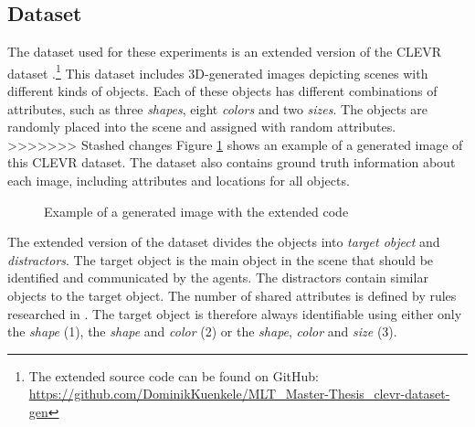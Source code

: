 \documentclass[11pt]{article}
\begin{document}
\subsection{Dataset}
The dataset used for these experiments is an extended version of the CLEVR dataset \citep{Johnson2016}.\footnote{The extended source code can be found on GitHub: \href{https://github.com/DominikKuenkele/MLT\_Master-Thesis\_clevr-dataset-gen}{https://github.com/DominikKuenkele/MLT\_Master-Thesis\_clevr-dataset-gen}} This dataset includes 3D-generated images depicting scenes with different kinds of objects. Each of these objects has different combinations of attributes, such as three \emph{shapes}, eight \emph{colors} and two \emph{sizes}. The objects are randomly placed into the scene and assigned with random attributes.
>>>>>>> Stashed changes
Figure \ref{fig:clevr-extended_example} shows an example of a generated image of this CLEVR dataset. The dataset also contains ground truth information about each image, including attributes and locations for all objects.

\begin{figure}[h]
  \centering
  \caption{Example of a generated image with the extended code} %
  \label{fig:clevr-extended_example}
\end{figure}

The extended version of the dataset divides the objects into \emph{target object} and \emph{distractors}. The target object is the main object in the scene that should be identified and communicated by the agents. The distractors contain similar objects to the target object. The number of shared attributes is defined by rules researched in \citet{Dale1995}. The target object is therefore always identifiable using either only the \emph{shape} (1), the \emph{shape} and \emph{color} (2) or the \emph{shape}, \emph{color} and \emph{size} (3).
\end{document}
